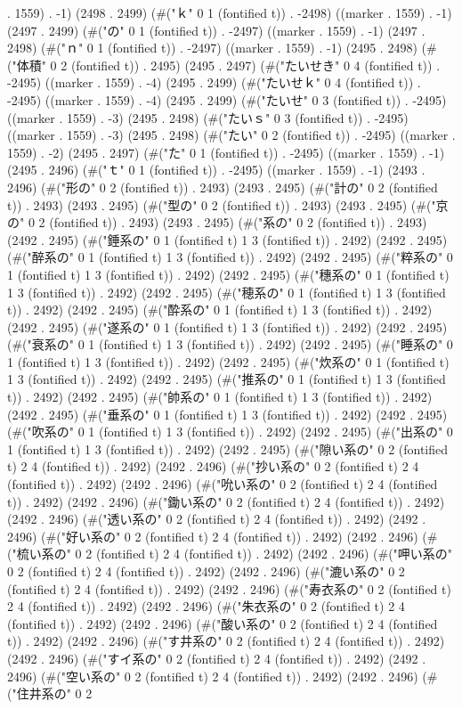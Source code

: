{. 1559) . -1) (2498 . 2499) (#("ｋ" 0 1 (fontified t)) . -2498) ((marker . 1559) . -1) (2497 . 2499) (#("の" 0 1 (fontified t)) . -2497) ((marker . 1559) . -1) (2497 . 2498) (#("ｎ" 0 1 (fontified t)) . -2497) ((marker . 1559) . -1) (2495 . 2498) (#("体積" 0 2 (fontified t)) . 2495) (2495 . 2497) (#("たいせき" 0 4 (fontified t)) . -2495) ((marker . 1559) . -4) (2495 . 2499) (#("たいせｋ" 0 4 (fontified t)) . -2495) ((marker . 1559) . -4) (2495 . 2499) (#("たいせ" 0 3 (fontified t)) . -2495) ((marker . 1559) . -3) (2495 . 2498) (#("たいｓ" 0 3 (fontified t)) . -2495) ((marker . 1559) . -3) (2495 . 2498) (#("たい" 0 2 (fontified t)) . -2495) ((marker . 1559) . -2) (2495 . 2497) (#("た" 0 1 (fontified t)) . -2495) ((marker . 1559) . -1) (2495 . 2496) (#("ｔ" 0 1 (fontified t)) . -2495) ((marker . 1559) . -1) (2493 . 2496) (#("形の" 0 2 (fontified t)) . 2493) (2493 . 2495) (#("計の" 0 2 (fontified t)) . 2493) (2493 . 2495) (#("型の" 0 2 (fontified t)) . 2493) (2493 . 2495) (#("京の" 0 2 (fontified t)) . 2493) (2493 . 2495) (#("系の" 0 2 (fontified t)) . 2493) (2492 . 2495) (#("錘系の" 0 1 (fontified t) 1 3 (fontified t)) . 2492) (2492 . 2495) (#("醉系の" 0 1 (fontified t) 1 3 (fontified t)) . 2492) (2492 . 2495) (#("粹系の" 0 1 (fontified t) 1 3 (fontified t)) . 2492) (2492 . 2495) (#("穗系の" 0 1 (fontified t) 1 3 (fontified t)) . 2492) (2492 . 2495) (#("穂系の" 0 1 (fontified t) 1 3 (fontified t)) . 2492) (2492 . 2495) (#("酔系の" 0 1 (fontified t) 1 3 (fontified t)) . 2492) (2492 . 2495) (#("遂系の" 0 1 (fontified t) 1 3 (fontified t)) . 2492) (2492 . 2495) (#("衰系の" 0 1 (fontified t) 1 3 (fontified t)) . 2492) (2492 . 2495) (#("睡系の" 0 1 (fontified t) 1 3 (fontified t)) . 2492) (2492 . 2495) (#("炊系の" 0 1 (fontified t) 1 3 (fontified t)) . 2492) (2492 . 2495) (#("推系の" 0 1 (fontified t) 1 3 (fontified t)) . 2492) (2492 . 2495) (#("帥系の" 0 1 (fontified t) 1 3 (fontified t)) . 2492) (2492 . 2495) (#("垂系の" 0 1 (fontified t) 1 3 (fontified t)) . 2492) (2492 . 2495) (#("吹系の" 0 1 (fontified t) 1 3 (fontified t)) . 2492) (2492 . 2495) (#("出系の" 0 1 (fontified t) 1 3 (fontified t)) . 2492) (2492 . 2495) (#("隙い系の" 0 2 (fontified t) 2 4 (fontified t)) . 2492) (2492 . 2496) (#("抄い系の" 0 2 (fontified t) 2 4 (fontified t)) . 2492) (2492 . 2496) (#("吮い系の" 0 2 (fontified t) 2 4 (fontified t)) . 2492) (2492 . 2496) (#("鋤い系の" 0 2 (fontified t) 2 4 (fontified t)) . 2492) (2492 . 2496) (#("透い系の" 0 2 (fontified t) 2 4 (fontified t)) . 2492) (2492 . 2496) (#("好い系の" 0 2 (fontified t) 2 4 (fontified t)) . 2492) (2492 . 2496) (#("梳い系の" 0 2 (fontified t) 2 4 (fontified t)) . 2492) (2492 . 2496) (#("呷い系の" 0 2 (fontified t) 2 4 (fontified t)) . 2492) (2492 . 2496) (#("漉い系の" 0 2 (fontified t) 2 4 (fontified t)) . 2492) (2492 . 2496) (#("寿衣系の" 0 2 (fontified t) 2 4 (fontified t)) . 2492) (2492 . 2496) (#("朱衣系の" 0 2 (fontified t) 2 4 (fontified t)) . 2492) (2492 . 2496) (#("酸い系の" 0 2 (fontified t) 2 4 (fontified t)) . 2492) (2492 . 2496) (#("す井系の" 0 2 (fontified t) 2 4 (fontified t)) . 2492) (2492 . 2496) (#("すイ系の" 0 2 (fontified t) 2 4 (fontified t)) . 2492) (2492 . 2496) (#("空い系の" 0 2 (fontified t) 2 4 (fontified t)) . 2492) (2492 . 2496) (#("住井系の" 0 2 }

